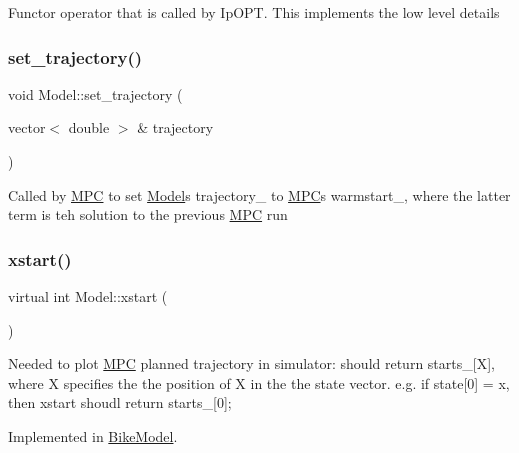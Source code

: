 Functor operator that is called by Ip\+O\+PT. This implements the low level details \mbox{\label{classModel_a98b6f05729855e93672272f5a9763566}} 
\subsubsection{\texorpdfstring{set\+\_\+trajectory()}{set\_trajectory()}}
{\footnotesize\ttfamily void Model\+::set\+\_\+trajectory (\begin{DoxyParamCaption}\item[{vector$<$ double $>$ \&}]{trajectory }\end{DoxyParamCaption})\hspace{0.3cm}{\ttfamily [inline]}}

Called by \mbox{\hyperlink{classMPC}{M\+PC}} to set \mbox{\hyperlink{classModel}{Model}}\textquotesingle{}s trajectory\+\_\+ to \mbox{\hyperlink{classMPC}{M\+PC}}\textquotesingle{}s warmstart\+\_\+, where the latter term is teh solution to the previous \mbox{\hyperlink{classMPC}{M\+PC}} run \mbox{\label{classModel_ab98f8c18036d9bada533325300865c5e}} 
\subsubsection{\texorpdfstring{xstart()}{xstart()}}
{\footnotesize\ttfamily virtual int Model\+::xstart (\begin{DoxyParamCaption}{ }\end{DoxyParamCaption})\hspace{0.3cm}{\ttfamily [pure virtual]}}

Needed to plot \mbox{\hyperlink{classMPC}{M\+PC}} planned trajectory in simulator\+: should return starts\+\_\+\mbox{[}X\mbox{]}, where X specifies the the position of X in the the state vector. e.\+g. if state\mbox{[}0\mbox{]} = x, then xstart shoudl return starts\+\_\+\mbox{[}0\mbox{]}; 

Implemented in \mbox{\hyperlink{classBikeModel_a920787379d6fef804f46bc1f3f885a89}{Bike\+Model}}.

\mbox{\label{classModel_ae505a277c05e465d0a41fa75d4116350}} 
